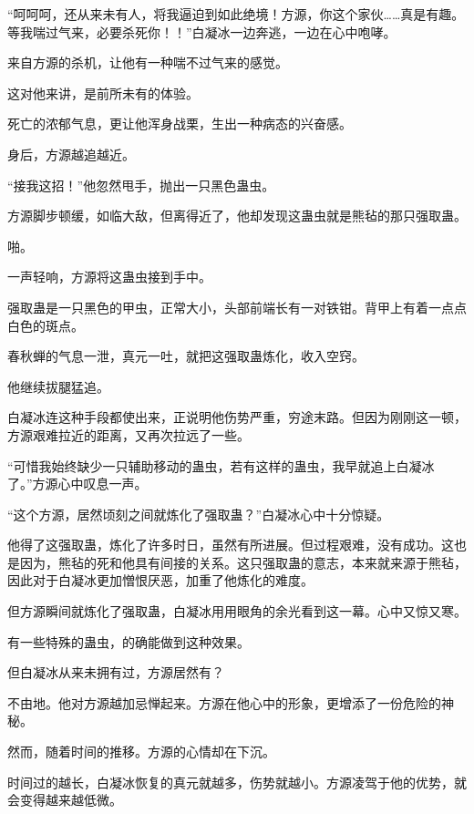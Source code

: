 
\begin{this_body}

“呵呵呵，还从来未有人，将我逼迫到如此绝境！方源，你这个家伙……真是有趣。等我喘过气来，必要杀死你！！”白凝冰一边奔逃，一边在心中咆哮。

来自方源的杀机，让他有一种喘不过气来的感觉。

这对他来讲，是前所未有的体验。

死亡的浓郁气息，更让他浑身战栗，生出一种病态的兴奋感。

身后，方源越追越近。

“接我这招！”他忽然甩手，抛出一只黑色蛊虫。

方源脚步顿缓，如临大敌，但离得近了，他却发现这蛊虫就是熊毡的那只强取蛊。

啪。

一声轻响，方源将这蛊虫接到手中。

强取蛊是一只黑色的甲虫，正常大小，头部前端长有一对铁钳。背甲上有着一点点白色的斑点。

春秋蝉的气息一泄，真元一吐，就把这强取蛊炼化，收入空窍。

他继续拔腿猛追。

白凝冰连这种手段都使出来，正说明他伤势严重，穷途末路。但因为刚刚这一顿，方源艰难拉近的距离，又再次拉远了一些。

“可惜我始终缺少一只辅助移动的蛊虫，若有这样的蛊虫，我早就追上白凝冰了。”方源心中叹息一声。

“这个方源，居然顷刻之间就炼化了强取蛊？”白凝冰心中十分惊疑。

他得了这强取蛊，炼化了许多时日，虽然有所进展。但过程艰难，没有成功。这也是因为，熊毡的死和他具有间接的关系。这只强取蛊的意志，本来就来源于熊毡，因此对于白凝冰更加憎恨厌恶，加重了他炼化的难度。

但方源瞬间就炼化了强取蛊，白凝冰用用眼角的余光看到这一幕。心中又惊又寒。

有一些特殊的蛊虫，的确能做到这种效果。

但白凝冰从来未拥有过，方源居然有？

不由地。他对方源越加忌惮起来。方源在他心中的形象，更增添了一份危险的神秘。

然而，随着时间的推移。方源的心情却在下沉。

时间过的越长，白凝冰恢复的真元就越多，伤势就越小。方源凌驾于他的优势，就会变得越来越低微。


\end{this_body}
